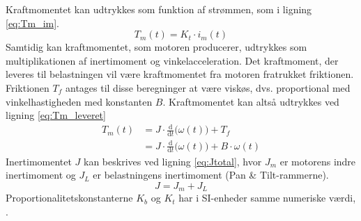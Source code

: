 Kraftmomentet kan udtrykkes som funktion af strømmen, som i ligning \ref{eq:Tm_im}.
\begin{equation}
	T_m\left(t\right)=K_t\cdot{i_m\left(t\right)}
	\label{eq:Tm_im} 
 \end{equation}
Samtidig kan kraftmomentet, som motoren producerer, udtrykkes som multiplikationen af inertimoment og vinkelacceleration.
Det kraftmoment, der leveres til belastningen vil være kraftmomentet fra motoren fratrukket friktionen.
Friktionen \(T_f\) antages til disse beregninger at være viskøs, dvs. proportional med vinkelhastigheden med konstanten \(B\).
Kraftmomentet kan altså udtrykkes ved ligning \ref{eq:Tm_leveret}
\begin{align}
	T_m\left(t\right)&=J\cdot\frac{\mathrm d}{\mathrm d t} \big(\omega\left(t\right) \big)+T_f\\
		&=J\cdot\frac{\mathrm d}{\mathrm d t} \big(\omega\left(t\right) \big)+B\cdot\omega\left(t\right)
	\label{eq:Tm_leveret} 
 \end{align}
Inertimomentet \(J\) kan beskrives ved ligning \ref{eq:Jtotal}, hvor \(J_m\) er motorens indre inertimoment og \(J_L\)
er belastningens inertimoment (Pan \& Tilt-rammerne).
\begin{equation}
	J=J_m+J_L
	\label{eq:Jtotal} 
 \end{equation}
Proportionalitetskonstanterne \(K_b\) og \(K_t\) har i SI-enheder samme numeriske værdi, \citep[Side. 5-6]{litteraturdcmodel}.

